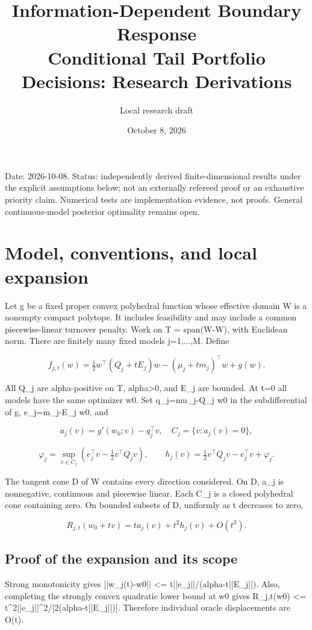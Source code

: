 \documentclass[10pt]{article}
\title{Information-Dependent Boundary Response\\\large Conditional Tail Portfolio Decisions: Research Derivations}
\author{Local research draft}
\date{October 8, 2026}
\begin{document}
\maketitle

Date: 2026-10-08. Status: independently derived finite-dimensional results under the explicit assumptions below; not an externally refereed proof or an exhaustive priority claim. Numerical tests are implementation evidence, not proofs. General continuous-model posterior optimality remains open.

\section{Model, conventions, and local expansion}

Let g be a fixed proper convex polyhedral function whose effective domain W is a nonempty compact polytope. It includes feasibility and may include a common piecewise-linear turnover penalty. Work on T = span(W-W), with Euclidean norm. There are finitely many fixed models j=1,...,M. Define

\[
f_{j,t}(w)=\tfrac12w^\top(Q_j+tE_j)w-(\mu_j+tm_j)^\top w+g(w).
\]



All Q\_j are alpha-positive on T, alpha>0, and E\_j are bounded. At t=0 all models have the same optimizer w0. Set q\_j=mu\_j-Q\_j w0 in the subdifferential of g, e\_j=m\_j-E\_j w0, and

\[
a_j(v)=g'(w_0;v)-q_j^\top v,\quad C_j=\{v:a_j(v)=0\},
\]


\[
\varphi_j=\sup_{v\in C_j}(e_j^\top v-\tfrac12v^\top Q_jv),\qquad
h_j(v)=\tfrac12v^\top Q_jv-e_j^\top v+\varphi_j.
\]



The tangent cone D of W contains every direction considered. On D, a\_j is nonnegative, continuous and piecewise linear. Each C\_j is a closed polyhedral cone containing zero. On bounded subsets of D, uniformly as t decreases to zero,

\begin{equation}
R_{j,t}(w_0+tv)=t a_j(v)+t^2 h_j(v)+O(t^3).\tag{1}
\end{equation}



\subsection*{Proof of the expansion and its scope}

Strong monotonicity gives ||w\_j(t)-w0|| <= t||e\_j||/(alpha-t||E\_j||). Also, completing the strongly convex quadratic lower bound at w0 gives R\_j,t(w0) <= t\textasciicircum{}2||e\_j||\textasciicircum{}2/[2(alpha-t||E\_j||)]. Therefore individual oracle displacements are O(t).
\end{document}
